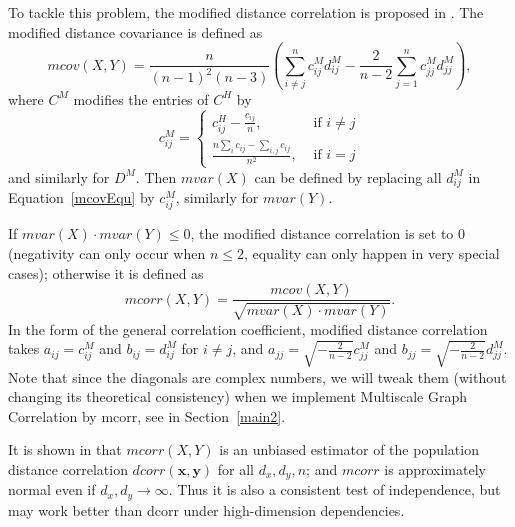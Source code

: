 \documentclass[11pt]{article}
\providecommand{\mb}[1]{\boldsymbol{#1}}
\begin{document}
To tackle this problem, the modified distance correlation is proposed in \cite{SzekelyRizzo2013a}. The modified distance covariance is defined as
\begin{equation}
\label{mcovEqu}
mcov(X,Y)=\frac{n}{(n-1)^2(n-3)}(\sum_{i \neq j}^{n}c^{M}_{ij}d^{M}_{ij}-\frac{2}{n-2}\sum_{j=1}^{n}c^{M}_{jj}d^{M}_{jj}),
\end{equation}
where $C^{M}$ modifies the entries of $C^{H}$ by
\[c^{M}_{ij} = \left\{
  \begin{array}{lr}
    c^{H}_{ij}-\frac{c_{ij}}{n}, & \mbox{ if } i \neq j \\
    \frac{n\sum_{i}c_{ij}-\sum_{i,j}c_{ij}}{n^2}, &\mbox{ if } i = j 
  \end{array}
\right.
\]
and similarly for $D^{M}$. Then $mvar(X)$ can be defined by replacing all $d^{M}_{ij}$ in Equation~\eqref{mcovEqu} by $c^{M}_{ij}$, similarly for $mvar(Y)$. 

If $mvar(X) \cdot mvar(Y) \leq 0$, the modified distance correlation is set to $0$ (negativity can only occur when $n\leq 2$, equality can only happen in very special cases); otherwise it is defined as
\begin{equation}
\label{mcorrEqu}
mcorr(X,Y)=\frac{mcov(X,Y)}{\sqrt{mvar(X) \cdot mvar(Y)}}.
\end{equation}
In the form of the general correlation coefficient, modified distance correlation takes $a_{ij}=c^{M}_{ij}$ and $b_{ij}=d^{M}_{ij}$ for $i \neq j$, and $a_{jj}=\sqrt{-\frac{2}{n-2}}c^{M}_{jj}$ and $b_{jj}=\sqrt{-\frac{2}{n-2}}d^{M}_{jj}$. Note that since the diagonals are complex numbers, we will tweak them (without changing its theoretical consistency) when we implement Multiscale Graph Correlation by mcorr, see in Section~\ref{main2}.

It is shown in \cite{SzekelyRizzo2013a} that $mcorr(X,Y)$ is an unbiased estimator of the population distance correlation $dcorr(\mb{x},\mb{y})$ for all $d_{x}, d_{y}, n$; and $mcorr$ is approximately normal even if $d_{x},d_{y} \rightarrow \infty$. Thus it is also a consistent test of independence, but may work better than dcorr under high-dimension dependencies. 
\end{document}
